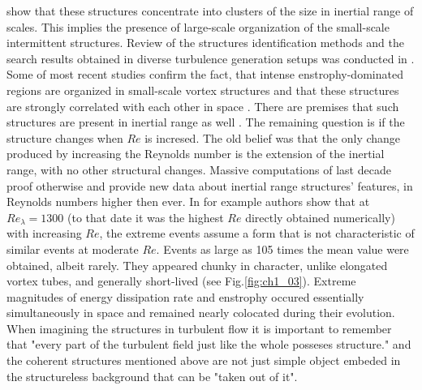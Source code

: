 \documentclass[../main.tex]{subfiles}
\begin{document}
\citep{Moisy2004} show that these structures concentrate into clusters of the size in inertial range of scales. This implies the presence of large-scale organization of the small-scale intermittent structures. Review of the structures identification methods and the search results obtained in diverse turbulence generation setups was conducted in  \citet{Wallace2009}. Some of most recent studies confirm the fact, that intense enstrophy-dominated regions are organized in small-scale vortex structures \citep{Vlaykov2019} and that these structures are strongly correlated with each other in space \citep{Yeung2012}. There are premises that such structures are present in inertial range as well \citep{Danish2018}. The remaining question is if the structure changes when $Re$ is incresed. The old belief was that the only change produced by increasing the Reynolds number is the extension of the inertial range, with no other structural changes. Massive computations of last decade proof otherwise and provide new data about inertial range structures' features, in Reynolds numbers higher then ever. In \citet{Yeung2015} for example authors show that at $Re_{\lambda}=1300$ (to that date it was the highest $Re$ directly obtained numerically) with increasing $Re$, the extreme events assume a form that is not characteristic of similar events at moderate $Re$. Events as large as 105 times the mean value were obtained, albeit rarely. They appeared chunky in character, unlike elongated vortex tubes, and generally short-lived (see Fig.\ref{fig:ch1_03}). Extreme magnitudes of energy dissipation rate and enstrophy occured essentially simultaneously in space and remained nearly colocated during their evolution. When imagining the structures in turbulent flow it is important to remember that "every part of the turbulent field just like the whole posseses structure." and the coherent structures mentioned above are not just simple object embeded in the structureless background that can be "taken out of it".\\
\end{document}
